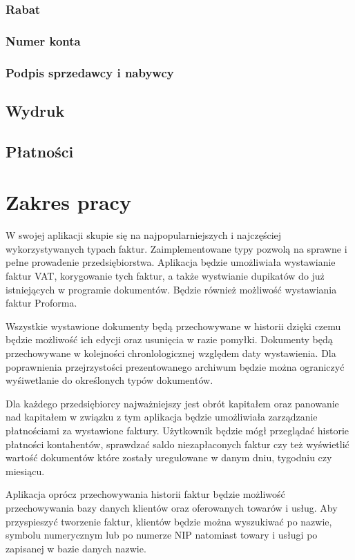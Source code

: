 \subsubsection{Rabat}
\subsubsection{Numer konta}
\subsubsection{Podpis sprzedawcy i nabywcy}
\subsection{Wydruk}
\subsection{Płatności}
\section{Zakres pracy}
W swojej aplikacji skupie się na najpopularniejszych i najczęściej
wykorzystywanych typach faktur. Zaimplementowane typy pozwolą na sprawne i pełne
prowadenie przedsiębiorstwa. Aplikacja będzie umożliwiała wystawianie faktur
VAT, korygowanie tych faktur, a także wystwianie dupikatów do już istniejących w
programie dokumentów. Będzie również możliwość wystawiania faktur Proforma. 

Wszystkie wystawione dokumenty będą przechowywane w historii dzięki czemu będzie
możliwość ich edycji oraz usunięcia w razie pomyłki. Dokumenty będą
przechowywane w kolejności chronlologicznej względem daty wystawienia. Dla
poprawnienia przejrzystości prezentowanego archiwum będzie można ograniczyć
wyśiwetlanie do określonych typów dokumentów.

Dla każdego przedsiębiorcy najważniejszy jest obrót kapitałem oraz panowanie nad
kapitałem w związku z tym aplikacja będzie umożliwiała zarządzanie płatnościami
za wystawione faktury. Użytkownik będzie mógł przeglądać historie płatności
kontahentów, sprawdzać saldo niezapłaconych faktur czy też wyświetlić wartość
dokumentów które zostały uregulowane w danym dniu, tygodniu czy miesiącu.

Aplikacja oprócz przechowywania historii faktur będzie możliwość przechowywania
bazy danych klientów oraz oferowanych towarów i usług. Aby przyspieszyć
tworzenie faktur, klientów będzie można wyszukiwać po nazwie, symbolu
numerycznym lub po numerze NIP natomiast towary i usługi po zapisanej w bazie
danych nazwie.

